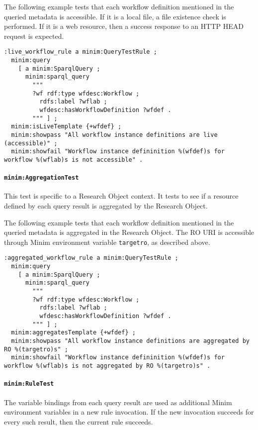 \documentclass[]{article}
\begin{document}
The following example tests that each workflow definition mentioned in
the queried metadata is accessible. If it is a local file, a file
existence check is performed. If it is a web resource, then a success
response to an HTTP HEAD request is expected.

\begin{verbatim}
:live_workflow_rule a minim:QueryTestRule ;
  minim:query 
    [ a minim:SparqlQuery ; 
      minim:sparql_query 
        """
        ?wf rdf:type wfdesc:Workflow ;
          rdfs:label ?wflab ;
          wfdesc:hasWorkflowDefinition ?wfdef .
        """ ] ;
  minim:isLiveTemplate {+wfdef} ;
  minim:showpass "All workflow instance definitions are live (accessible)" ;
  minim:showfail "Workflow instance defininition %(wfdef)s for workflow %(wflab)s is not accessible" .
\end{verbatim}

\paragraph{\texttt{minim:AggregationTest}}

This test is specific to a Research Object context. It tests to see if a
resource defined by each query result is aggregated by the Research
Object.

The following example tests that each workflow definition mentioned in
the queried metadata is aggregated in the Research Object. The RO URI is
accessible through Minim environment variable \texttt{targetro}, as
described above.

\begin{verbatim}
:aggregated_workflow_rule a minim:QueryTestRule ;
  minim:query 
    [ a minim:SparqlQuery ; 
      minim:sparql_query 
        """
        ?wf rdf:type wfdesc:Workflow ;
          rdfs:label ?wflab ;
          wfdesc:hasWorkflowDefinition ?wfdef .
        """ ] ;
  minim:aggregatesTemplate {+wfdef} ;
  minim:showpass "All workflow instance definitions are aggregated by RO %(targetro)s" ;
  minim:showfail "Workflow instance defininition %(wfdef)s for workflow %(wflab)s is not aggregated by RO %(targetro)s" .
\end{verbatim}

\paragraph{\texttt{minim:RuleTest}}

The variable bindings from each query result are used as additional
Minim environment variables in a new rule invocation. If the new
invocation succeeds for every such result, then the current rule
succeeds.
\end{document}
